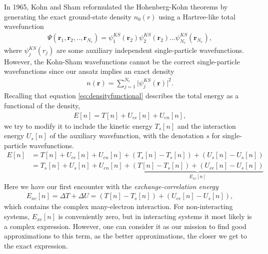 In 1965, Kohn and Sham \cite{Kohn1965} reformulated the Hohenberg-Kohn theorems by generating the exact ground-state density $n_0(r)$ using a Hartree-like total wavefunction
\begin{align}
    \Psi(\boldsymbol{r}_1,\boldsymbol{r}_2,..,\boldsymbol{r}_{N_e}) = \psi_1^{KS}(\boldsymbol{r}_2)\psi_2^{KS}(\boldsymbol{r}_2)...\psi_{N_e}^{KS}(\boldsymbol{r}_{N_e}),
\end{align}
where $\psi_j^{KS}(r_j)$ are some auxiliary independent single-particle wavefunctions. However, the Kohn-Sham wavefunctions cannot be the correct single-particle wavefunctions since our ansatz implies an exact density
\begin{align}
  n(\boldsymbol{r}) = \sum_{j=1}^{N_e}\lvert \psi_j^{KS}(\boldsymbol{r})\rvert^2.
\end{align}
Recalling that equation \autoref{eq:densityfunctional} describes the total energy as a functional of the density,
\begin{align}
  E[n] = T[n] + U_{ee}[n] + U_{en}[n],
\end{align}
we try to modify it to include the kinetic energy $T_s[n]$ and the interaction energy $U_s[n]$ of the auxiliary wavefunction, with the denotation $s$ for single-particle wavefunctions.
\begin{align*}
  E[n] &= T[n] + U_{ee}[n] + U_{en}[n] + \left( T_s[n] - T_s[n] \right) + \left( U_s[n] - U_s[n] \right) \\
  &= T_s[n] + U_{s}[n] + U_{en}[n] + \underbrace{\left(T[n] - T_s[n] \right) + \left( U_{ee}[n] - U_s[n] \right)}_{E_{xc}[n]}
\end{align*}
Here we have our first encounter with the \textit{exchange-correlation energy}
\begin{align}
  E_{xc}[n] = \Delta T + \Delta U = \left(T[n] - T_s[n] \right) + \left( U_{ee}[n] - U_s[n] \right),
\end{align}
which contains the complex many-electron interaction. For non-interacting systems, $E_{xc}[n]$ is conveniently zero, but in interacting systems it most likely is a complex expression. However, one can consider it as our mission to find good approximations to this term, as the better approximations, the closer we get to the exact expression.

